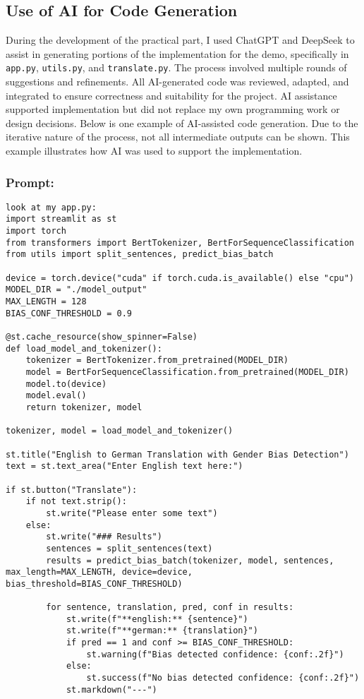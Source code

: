\begin{appendices}
\subsection{Use of AI for Code Generation}\label{appendix:ai_code}
During the development of the practical part, I used ChatGPT and DeepSeek to assist in generating portions of the implementation for the demo, specifically in \texttt{app.py}, \texttt{utils.py}, and \texttt{translate.py}. The process involved multiple rounds of suggestions and refinements. All AI-generated code was reviewed, adapted, and integrated to ensure correctness and suitability for the project. AI assistance supported implementation but did not replace my own programming work or design decisions. Below is one example of AI-assisted code generation. Due to the iterative nature of the process, not all intermediate outputs can be shown. This example illustrates how AI was used to support the implementation.


\subsubsection{Prompt: } 

\begin{lstlisting}
look at my app.py: 
import streamlit as st
import torch
from transformers import BertTokenizer, BertForSequenceClassification
from utils import split_sentences, predict_bias_batch

device = torch.device("cuda" if torch.cuda.is_available() else "cpu")
MODEL_DIR = "./model_output" 
MAX_LENGTH = 128
BIAS_CONF_THRESHOLD = 0.9

@st.cache_resource(show_spinner=False)
def load_model_and_tokenizer():
    tokenizer = BertTokenizer.from_pretrained(MODEL_DIR)
    model = BertForSequenceClassification.from_pretrained(MODEL_DIR)
    model.to(device)
    model.eval()
    return tokenizer, model

tokenizer, model = load_model_and_tokenizer()

st.title("English to German Translation with Gender Bias Detection")
text = st.text_area("Enter English text here:")

if st.button("Translate"):
    if not text.strip():
        st.write("Please enter some text")
    else:
        st.write("### Results")
        sentences = split_sentences(text)
        results = predict_bias_batch(tokenizer, model, sentences, max_length=MAX_LENGTH, device=device, bias_threshold=BIAS_CONF_THRESHOLD)

        for sentence, translation, pred, conf in results:
            st.write(f"**english:** {sentence}")
            st.write(f"**german:** {translation}")
            if pred == 1 and conf >= BIAS_CONF_THRESHOLD:
                st.warning(f"Bias detected confidence: {conf:.2f}")
            else:
                st.success(f"No bias detected confidence: {conf:.2f}")
            st.markdown("---")


\end{lstlisting}
\end{appendices}
